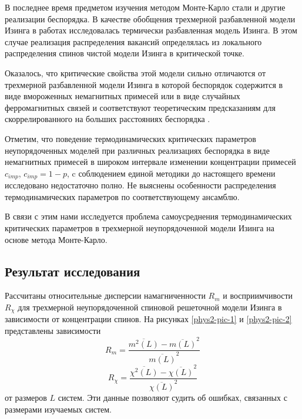 В последнее время предметом изучения методом Монте-Карло стали и другие реализации беспорядка. В качестве обобщения трехмерной разбавленной модели Изинга в работах \cite{ph2_5, ph2_6} исследовалась термически разбавленная модель Изинга. В этом случае реализация распределения вакансий определялась из локального распределения спинов чистой модели Изинга в критической точке.

Оказалось, что критические свойства этой модели сильно отличаются от трехмерной разбавленной модели Изинга в которой беспорядок содержится в виде вмороженных немагнитных примесей или в виде случайных ферромагнитных связей и соответствуют теоретическим предсказаниям для скоррелированного на больших расстояниях беспорядка \cite{ph2_7}.

Отметим, что поведение термодинамических критических параметров неупорядоченных моделей при различных реализациях беспорядка в виде немагнитных примесей в широком интервале изменении концентрации примесей $c_{imp}$, $c_{imp}=1-p$, c соблюдением единой методики до настоящего времени исследовано недостаточно полно. Не выяснены особенности распределения термодинамических параметров по соответствующему ансамблю.

В связи с этим нами исследуется проблема самоусреднения термодинамических критических параметров в трехмерной неупорядоченной модели Изинга на основе метода Монте-Карло.






\subsection{Результат исследования}


Рассчитаны относительные дисперсии намагниченности  $R_m$ и восприимчивости $R_\chi$  для трехмерной неупорядоченной спиновой решеточной модели Изинга в зависимости от концентрации спинов.  На рисунках \ref{phys2-pic-1} и \ref{phys2-pic-2} представлены зависимости
\begin{equation*}
  R_m = \frac{\overline{m^2(L)}-\overline{m(L)}^2}{\overline{m(L)}^2}
\end{equation*}
\begin{equation*}
  R_\chi = \frac{\overline{\chi^2(L)}-\overline{\chi(L)}^2}{\overline{\chi(L)}^2}
\end{equation*}
от размеров $L$ систем. Эти данные позволяют судить об ошибках, связанных с размерами изучаемых систем.




